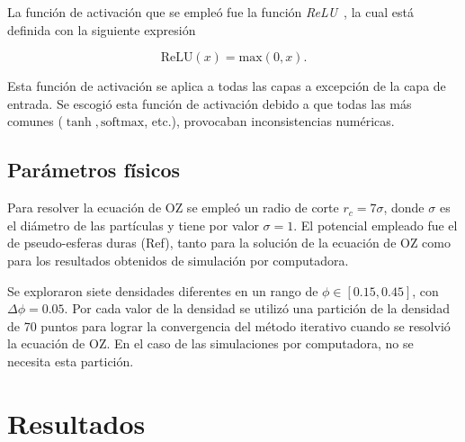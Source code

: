 La función de activación que se empleó fue la función \emph{ReLU}~\cite{glorotDeepSparseRectifier2011},
la cual está definida con la siguiente expresión

\begin{equation*}
    \text{ReLU}(x) = \text{max}{(0, x)} .
\end{equation*}

Esta función de activación se aplica a todas las capas a excepción de la capa de entrada.
Se escogió esta función de activación debido a que todas las más comunes ($\tanh, \text{softmax}$, etc.),
provocaban inconsistencias numéricas.

\subsection{Parámetros físicos}

Para resolver la ecuación de OZ se empleó un radio de corte $r_c=7\sigma$, donde $\sigma$
es el diámetro de las partículas y tiene por valor $\sigma=1$.
El potencial empleado fue el de pseudo-esferas duras (Ref), tanto para la solución de la ecuación
de OZ como para los resultados obtenidos de simulación por computadora.

Se exploraron siete densidades diferentes en un rango de
$\phi \in [\num{0.15}, \num{0.45}]$, con $\Delta \phi = \num{0.05}$. Por cada valor
de la densidad se utilizó una partición de la densidad de 70 puntos para lograr la
convergencia del método iterativo cuando se resolvió la ecuación de OZ. En el caso de las
simulaciones por computadora, no se necesita esta partición.

\section{Resultados}

